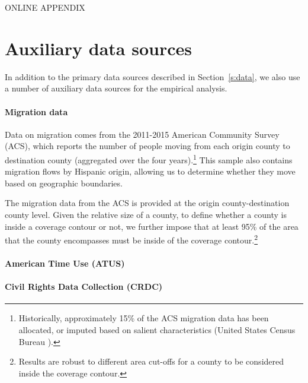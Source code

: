 \documentclass[11pt]{article}
\begin{document}
\renewcommand*{\theHfigure}{\arabic{section}.\arabic{figure}} 
\setcounter{figure}{0}
\renewcommand\thefigure{A.\arabic{figure}}


\renewcommand*{\theHtable}{\arabic{section}.\arabic{table}} 
\setcounter{table}{0}
\renewcommand\thetable{A.\arabic{table}}

\renewcommand{\thesection}{Appendix \Alph{section}}



\begin{center}
\Large ONLINE APPENDIX
\end{center}

\section{Auxiliary data sources} \label{a:auxiliarydata}

In addition to the primary data sources described in Section~\ref{s:data}, we also use a number of auxiliary data sources for the empirical analysis.


\paragraph{Migration data}

Data on migration comes from the 2011-2015 American Community Survey (ACS), which reports the number of people moving from each origin county to destination county (aggregated over the four years).\footnote{ Historically, approximately 15\% of the ACS migration data has been allocated, or imputed based on salient characteristics (United States Census Bureau \cite{noauthor_american_2020}). } This sample also contains migration flows by Hispanic origin, allowing us to determine whether they move based on geographic boundaries.

The migration data from the ACS is provided at the origin county-destination county level. Given the relative size of a county, to define whether a county is inside a coverage contour or not, we further impose that at least 95\% of the area that the county encompasses must be inside of the coverage contour.\footnote{ Results are robust to different area cut-offs for a county to be considered inside the coverage contour.} 


\paragraph{American Time Use (ATUS)}

\paragraph{Civil Rights Data Collection (CRDC)}
\end{document}
